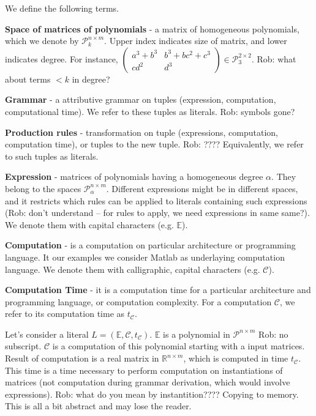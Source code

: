 We define the following terms. %


{\bf Space of matrices of polynomials} - a matrix of homogeneous polynomials, which we denote by $\mathcal{P}^{n \times m}_k$. Upper index indicates size of matrix, and lower indicates degree. For instance, $\begin{pmatrix} a^3 + b^3 & b^3 + bc^2 + c^3\\ cd^2 & d^3 \end{pmatrix} \in \mathcal{P}^{2 \times 2}_3$. 
Rob: what about terms $<k$ in degree?

{\bf Grammar} - a attributive grammar on tuples (expression, computation, computational time). We refer to these tuples as literals. Rob: symbols gone?


{\bf Production rules} - transformation on tuple (expressions, computation, computation time), or tuples to the new tuple. Rob: ???? Equivalently, we refer to such tuples as literals. 


{\bf Expression} - matrices of polynomials having a homogeneous degree $\alpha$. They belong to the spaces $\mathcal{P}^{n \times m}_\alpha$. Different expressions might be in different spaces, and it restricts which rules can be 
applied to literals containing such expressions (Rob: don't understand -- for rules to apply, we need expressions in same same?). We denote them with capital characters (e.g. $\mathbb{E}$).


{\bf Computation} - is a computation on particular architecture or programming language. It our examples we consider Matlab as underlaying computation language. We denote them with calligraphic, capital characters (e.g. $\mathcal{C}$).


{\bf Computation Time} - it is a computation time for a particular architecture and programming language, or computation complexity. For a computation $\mathcal{C}$, we refer to its computation time as $t_{\mathcal{C}}$. 


Let's consider a literal $L = (\mathbb{E}, \mathcal{C}, t_\mathcal{C})$. $\mathbb{E}$ is a polynomial in $\mathcal{P}^{n \times m}$ Rob: no subscript. $\mathcal{C}$ is a computation of this polynomial starting with a input matrices. Result of computation is a real matrix
in $\mathbb{R}^{n \times m}$, which is computed in time $t_\mathcal{C}$. This time is a time necessary to perform computation on instantiations of matrices (not computation during grammar derivation, which would involve expressions). Rob: what do you mean by instantition???? Copying to memory. This is all a bit abstract and may lose the reader.

